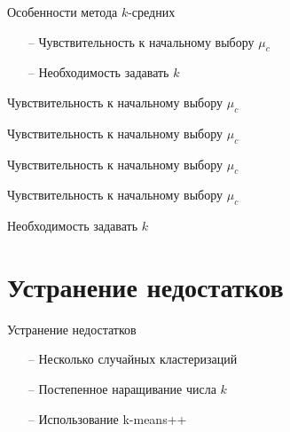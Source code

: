 \documentclass[10pt]{beamer}
\begin{document}
\begin{frame}{Особенности метода $k$-средних}
	\begin{itemize}
		\item[--] Чувствительность к начальному выбору $\mu_c$
		\item[--] Необходимость задавать $k$
	\end{itemize}
\end{frame}

\begin{frame}{Чувствительность к начальному выбору $\mu_c$}
\end{frame}

\begin{frame}{Чувствительность к начальному выбору $\mu_c$}
\end{frame}

\begin{frame}{Чувствительность к начальному выбору $\mu_c$}
\end{frame}

\begin{frame}{Чувствительность к начальному выбору $\mu_c$}
\end{frame}

\begin{frame}{Необходимость задавать $k$}
\end{frame}

\section{Устранение недостатков}

\begin{frame}{Устранение недостатков}
	\begin{itemize} [<+- | alert@+>]
		\item[--] Несколько случайных кластеризаций
		\item[--] Постепенное наращивание числа $k$
		\item[--] Использование k-means++
	\end{itemize}
\end{frame}
\end{document}
